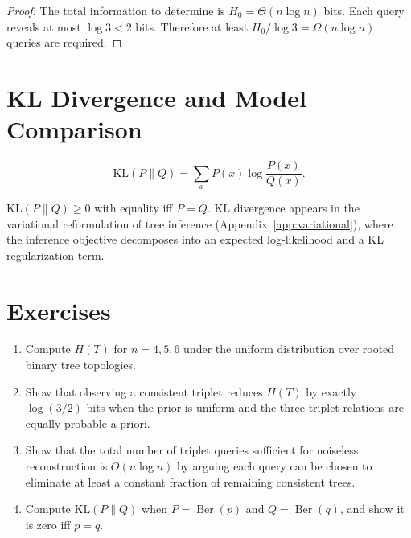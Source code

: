 \begin{proof}
The total information to determine is $H_0 = \Theta(n \log n)$ bits. Each query reveals at most $\log 3 < 2$ bits. Therefore at least $H_0 / \log 3 = \Omega(n \log n)$ queries are required.
\end{proof}

\section{KL Divergence and Model Comparison}

\begin{definition}[KL divergence]
\[
\mathrm{KL}(P \| Q) = \sum_x P(x) \log \frac{P(x)}{Q(x)}.
\]
\end{definition}

$\mathrm{KL}(P\|Q) \geq 0$ with equality iff $P = Q$. KL divergence appears in the variational reformulation of tree inference (Appendix~\ref{app:variational}), where the inference objective decomposes into an expected log-likelihood and a KL regularization term.

\section{Exercises}

\begin{enumerate}
  \item Compute $H(T)$ for $n = 4, 5, 6$ under the uniform distribution over rooted binary tree topologies.
  \item Show that observing a consistent triplet reduces $H(T)$ by exactly $\log(3/2)$ bits when the prior is uniform and the three triplet relations are equally probable a priori.
  \item Show that the total number of triplet queries sufficient for noiseless reconstruction is $O(n \log n)$ by arguing each query can be chosen to eliminate at least a constant fraction of remaining consistent trees.
  \item Compute $\mathrm{KL}(P\|Q)$ when $P = \operatorname{Ber}(p)$ and $Q = \operatorname{Ber}(q)$, and show it is zero iff $p = q$.
\end{enumerate}
